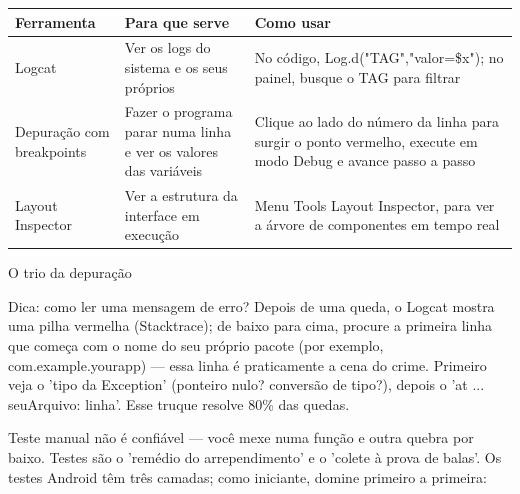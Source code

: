 


\begin{center}
\begin{tabularx}{\linewidth}{|X|X|X|}
\hline
\textbf{Ferramenta} & \textbf{Para que serve} & \textbf{Como usar} \tabularnewline
\hline
Logcat & Ver os logs do sistema e os seus próprios & No código, Log.d("TAG","valor=\$x"); no painel, busque o TAG para filtrar \tabularnewline
Depuração com breakpoints & Fazer o programa parar numa linha e ver os valores das variáveis & Clique ao lado do número da linha para surgir o ponto vermelho, execute em modo Debug e avance passo a passo \tabularnewline
Layout Inspector & Ver a estrutura da interface em execução & Menu Tools Layout Inspector, para ver a árvore de componentes em tempo real \tabularnewline
\hline
\end{tabularx}
\end{center}

\begin{center}\small\color{gray}O trio da depuração\end{center}

\begin{tcbinfo}{Dica: como ler uma mensagem de erro?}
Depois de uma queda, o Logcat mostra uma pilha vermelha (Stacktrace); de baixo para cima, procure a primeira linha que começa com o nome do seu próprio pacote (por exemplo, com.example.yourapp) — essa linha é praticamente a cena do crime. Primeiro veja o 'tipo da Exception' (ponteiro nulo? conversão de tipo?), depois o 'at ... seuArquivo: linha'. Esse truque resolve 80\% das quedas.

\end{tcbinfo}


Teste manual não é confiável — você mexe numa função e outra quebra por baixo. Testes são o 'remédio do arrependimento' e o 'colete à prova de balas'. Os testes Android têm três camadas; como iniciante, domine primeiro a primeira:


